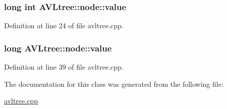 \hypertarget{struct_a_v_ltree_1_1node_a07a4c51fe0378bd7c523fbfe1c0d8ecc}{
\subsubsection[{value}]{\setlength{\rightskip}{0pt plus 5cm}long int A\-V\-Ltree\-::node\-::value}}\label{struct_a_v_ltree_1_1node_a07a4c51fe0378bd7c523fbfe1c0d8ecc}


Definition at line 24 of file avltree.\-cpp.

\hypertarget{struct_a_v_ltree_1_1node_ad193d6c64cf315f35c953f1e19830a6a}{
\subsubsection[{value}]{\setlength{\rightskip}{0pt plus 5cm}long A\-V\-Ltree\-::node\-::value}}\label{struct_a_v_ltree_1_1node_ad193d6c64cf315f35c953f1e19830a6a}


Definition at line 39 of file avltree.\-cpp.



The documentation for this class was generated from the following file\-:\begin{DoxyCompactItemize}
\item 
\hyperlink{avltree_8cpp}{avltree.\-cpp}\end{DoxyCompactItemize}
